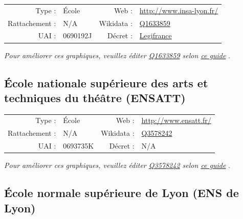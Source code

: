 \documentclass[11pt,french,landscape]{article}
\begin{document}
\begin{tabular*}{0.45\textwidth}{rp{2cm}rl}  
\hline  
Type : & École & Web : &\href{http://www.insa-lyon.fr/}{http://www.insa-lyon.fr/} \\  
Rattachement : & N/A & Wikidata : & \href{https://www.wikidata.org/entity/Q1633859}{Q1633859} \\  
UAI : & 0690192J & Décret : & \href{Abrogé}{Legifrance} \\  
\hline  
\end{tabular*}

\textit{\scriptsize Pour améliorer ces graphiques, veuillez éditer \href{https://www.wikidata.org/entity/Q1633859}{Q1633859}  selon \href{https://github.com/cpesr/wikidataESR/blob/master/Rmd/wikidataESR.md}{ce guide}}
.


\newpage

\hypertarget{uxe9cole-nationale-supuxe9rieure-des-arts-et-techniques-du-thuxe9uxe2tre-ensatt}{%
\subsection{École nationale supérieure des arts et techniques du théâtre
(ENSATT)}\label{uxe9cole-nationale-supuxe9rieure-des-arts-et-techniques-du-thuxe9uxe2tre-ensatt}}

\begin{tabular*}{0.45\textwidth}{rp{2cm}rl}  
\hline  
Type : & École & Web : &\href{http://www.ensatt.fr/}{http://www.ensatt.fr/} \\  
Rattachement : & N/A & Wikidata : & \href{https://www.wikidata.org/entity/Q3578242}{Q3578242} \\  
UAI : & 0693735K & Décret : & N/A \\  
\hline  
\end{tabular*}

\textit{\scriptsize Pour améliorer ces graphiques, veuillez éditer \href{https://www.wikidata.org/entity/Q3578242}{Q3578242}  selon \href{https://github.com/cpesr/wikidataESR/blob/master/Rmd/wikidataESR.md}{ce guide}}
.


\newpage

\hypertarget{uxe9cole-normale-supuxe9rieure-de-lyon-ens-de-lyon}{%
\subsection{École normale supérieure de Lyon (ENS de
Lyon)}\label{uxe9cole-normale-supuxe9rieure-de-lyon-ens-de-lyon}}
\end{document}

